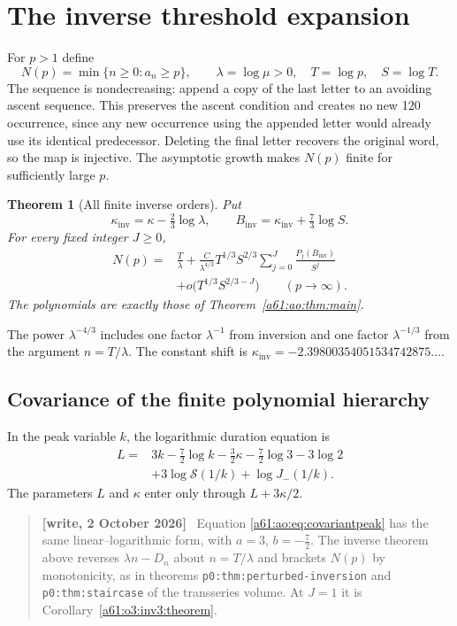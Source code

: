 \documentclass[11pt,letterpaper]{article}
\numberwithin{equation}{section}
\newtheorem{theorem}{Theorem}[section]
\theoremstyle{remark}\newtheorem{remark}[theorem]{Remark}
\newcommand{\Srow}{\mathcal S}
\newenvironment{writenote}{\par\smallskip\begin{quote}\small\textbf{[write, 2 October 2026]}\ }{\end{quote}\smallskip}
\begin{document}
\section{The inverse threshold expansion}\label{a61:ao:sec:inverse}
For $p>1$ define
\[
 N(p)=\min\{n\ge0:a_n\ge p\},\qquad
 \lambda=\log\mu>0,\quad T=\log p,\quad S=\log T.
\]
The sequence is nondecreasing: append a copy of the last letter to an
avoiding ascent sequence. This preserves the ascent condition and
creates no new 120 occurrence, since any new occurrence using the
appended letter would already use its identical predecessor. Deleting
the final letter recovers the original word, so the map is injective.
The asymptotic growth makes $N(p)$ finite for sufficiently large $p$.

\begin{theorem}[All finite inverse orders]\label{a61:ao:thm:inverse}
Put
\[
 \kappa_{\mathrm{inv}}=\kappa-\tfrac23\log\lambda,
 \qquad B_{\mathrm{inv}}=\kappa_{\mathrm{inv}}+\tfrac73\log S.
\]
For every fixed integer $J\ge0$,
\begin{equation}\label{a61:ao:eq:inverse}
 \begin{split}
 N(p)={}&\frac T\lambda+
 \frac C{\lambda^{4/3}}T^{1/3}S^{2/3}
 \sum_{j=0}^J\frac{P_j(B_{\mathrm{inv}})}{S^j}\\
 &+o\bigl(T^{1/3}S^{2/3-J}\bigr)
 \qquad(p\to\infty).
 \end{split}
\end{equation}
The polynomials are exactly those of Theorem~\ref{a61:ao:thm:main}.
\end{theorem}
The power $\lambda^{-4/3}$ includes one factor $\lambda^{-1}$ from
inversion and one factor $\lambda^{-1/3}$ from the argument
$n=T/\lambda$. The constant shift is
$\kappa_{\mathrm{inv}}=-2.39800354051534742875\ldots$.

\subsection{Covariance of the finite polynomial hierarchy}
In the peak variable $k$, the logarithmic duration equation is
\begin{equation}\label{a61:ao:eq:covariantpeak}
 \begin{split}
 L={}&3k-\tfrac72\log k-\tfrac32\kappa-\tfrac72\log3-3\log2\\
 &+3\log\Srow(1/k)+\log J_-(1/k).
 \end{split}
\end{equation}
The parameters $L$ and $\kappa$ enter only through $L+3\kappa/2$.
\begin{writenote}
Equation \eqref{a61:ao:eq:covariantpeak} has the same linear--logarithmic form, with $a=3$, $b=-\frac72$. The inverse theorem above reverses $\lambda n-D_n$ about $n=T/\lambda$ and brackets $N(p)$ by monotonicity, as in theorems \texttt{p0:thm:perturbed-inversion} and \texttt{p0:thm:staircase} of the transseries volume. At $J=1$ it is Corollary~\ref{a61:o3:inv3:theorem}.
\end{writenote}
\end{document}
